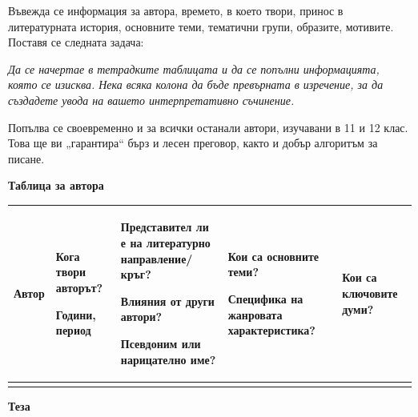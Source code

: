 \documentclass[12pt,a4paper]{article}
\begin{document}
Въвежда се информация за автора, времето, в което твори,
принос в литературната история, основните теми, тематични групи,
образите, мотивите. Поставя се следната задача:

\medskip

\emph{
Да се начертае в тетрадките таблицата и да се попълни информацията,
която се изисква. Нека всяка колона да бъде превърната в изречение, за да създадете увода на вашето интерпретативно съчинение.
}

\medskip

Попълва се своевременно и за всички останали автори,
изучавани в 11 и 12 клас. Това ще ви „гарантира“ бърз и лесен
преговор, както и добър алгоритъм за писане.

\vspace{-0.1cm}


\begin{center}
\textbf{Таблица за автора}
\end{center}

\vspace{0.11cm}

\begin{tabularx}{\textwidth}{|
    P{1.6cm}|
    P{2.7cm}|
    X|
    X|
    P{3.0cm}|
}
\hline

\textbf{Автор}
&
\textbf{Кога твори авторът?}

Години, период
&
\textbf{Представител ли е на литературно направление/кръг?}

Влияния от други автори?

Псевдоним или нарицателно име?
&
\textbf{Кои са основните теми?}

Специфика на жанровата характеристика?
&
\textbf{Кои са ключовите думи?}
\\
\hline

\vspace{3cm}
&
&
&
&
\\
\hline

\end{tabularx}

\vspace{0.7cm}


\textbf{Теза}
\end{document}
